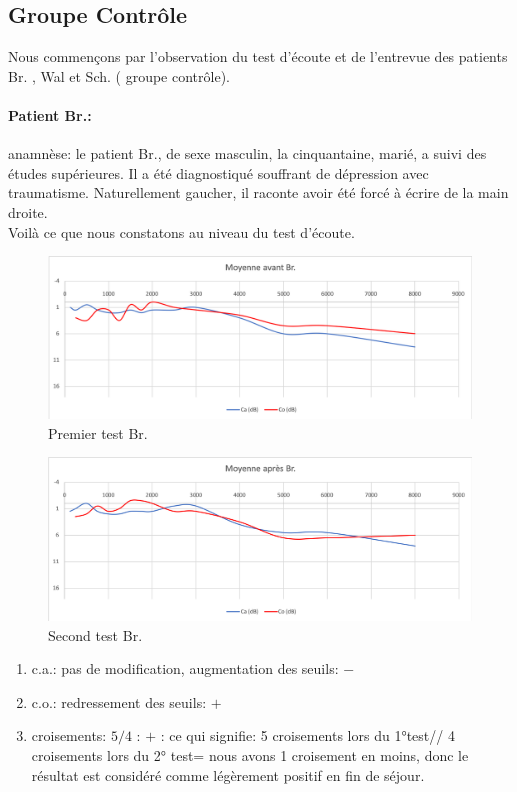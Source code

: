  \subsection{Groupe Contrôle }
  Nous commençons par l'observation du  test d'écoute et de l'entrevue  des patients Br. , Wal et Sch. ( 
  groupe contrôle).
  \paragraph{ Patient Br.:}
  anamnèse: le patient Br., de sexe masculin, la cinquantaine, marié, a suivi des études 
  supérieures. Il a été 
  diagnostiqué souffrant de dépression avec 
  traumatisme.  Naturellement gaucher, il raconte avoir été forcé à écrire de la main droite.
   \\
  Voilà ce que nous constatons au niveau du test d'écoute.
  \begin{figure}[ht]
\centering
\includegraphics[width=0.7\linewidth]{images/graphiques/bru_pre.png}
\caption[  \textbf{Groupe Contrôle}: Patient Br.. 1° test]{Premier test Br.}
\end{figure}



 \begin{figure}[th]
\centering
\includegraphics[width=0.7\linewidth]{images/graphiques/bru_post.png}
\caption[Patient Br. :  2° test]{Second test Br.}

\end{figure}

	\begin{enumerate}
 		\item  c.a.: pas de modification, augmentation des
                  seuils: $-$
 		\item  c.o.: redressement des seuils: $+$
 		\item  croisements: $5/4$ : $+$ : ce qui signifie:  5 croisements lors du 1°test// 4 croisements lors du 
 		2° test= nous avons 1 croisement en moins, donc le résultat est considéré comme légèrement 
 		positif en fin
                  de séjour.
                \end{enumerate}

